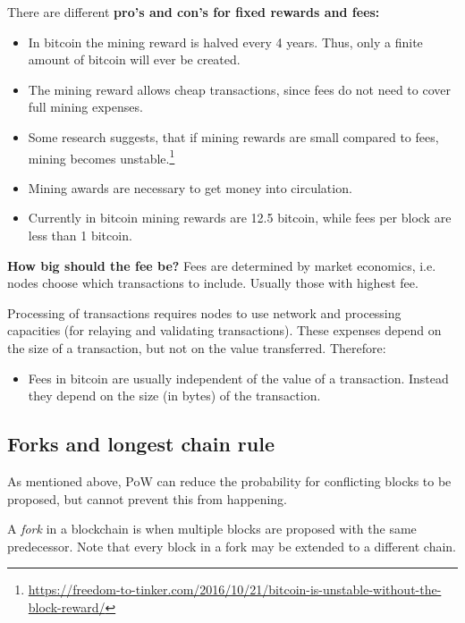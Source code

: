 \begin{note} There are different \textbf{pro's and con's for fixed rewards and fees:}
	\begin{itemize}
		\item In bitcoin the mining reward is halved every 4 years. Thus, only a finite amount of bitcoin will ever be created.
		\item The mining reward allows cheap transactions, since fees do not need to cover full mining expenses.
		\item Some research suggests, that if mining rewards are small compared to fees, mining becomes unstable.\footnote{\url{https://freedom-to-tinker.com/2016/10/21/bitcoin-is-unstable-without-the-block-reward/}}
		\item Mining awards are necessary to get money into circulation.
		\item Currently in bitcoin mining rewards are 12.5 bitcoin, while fees per block are less than 1 bitcoin.
	\end{itemize}
\end{note}


\begin{note} \textbf{How big should the fee be?}
Fees are determined by market economics, i.e. nodes choose which transactions to include. Usually those with highest fee.
	
Processing of transactions requires nodes to use network and processing capacities (for relaying and validating transactions). These expenses depend on the size of a transaction, but not on the value transferred. Therefore:
\begin{itemize}
	\item Fees in bitcoin are usually independent of the value of a transaction. Instead they depend on the size (in bytes) of the transaction.
\end{itemize}
\end{note}

\subsection{Forks and longest chain rule}
As mentioned above, PoW can reduce the probability for conflicting blocks to be proposed, but cannot prevent this from happening.

\begin{definition} A \emph{fork} in a blockchain is when multiple blocks are proposed with the same predecessor. Note that every block in a fork may be extended to a different chain.
\end{definition}

